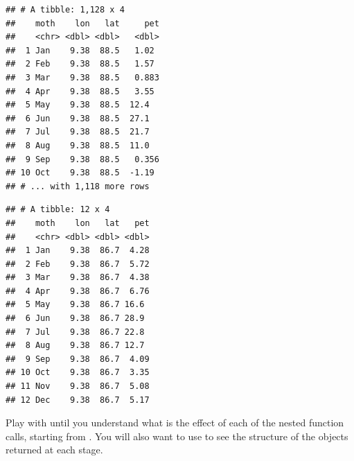 \documentclass[krantz2]{krantz}\usepackage{knitr}%
\begin{document}
\begin{knitrout}\footnotesize
{}\color{fgcolor}\begin{kframe}
\begin{alltt}
 \hlkwb{<-}
    \hlstd{(} \hlstd{=} \hlstd{(month.abb[}\hlopt{:}\hlstd{],} 
            \hlstd{= longitude[}\hlstd{],}
            \hlstd{=}   \hlstd{=} \hlstd{),}
            \hlstd{=} \hlstd{(}\hlstd{(} \hlstd{)[}\hlstd{, , ]))}
           \hlstd{)}
\end{alltt}
\begin{verbatim}
## # A tibble: 1,128 x 4
##    moth    lon   lat     pet
##    <chr> <dbl> <dbl>   <dbl>
##  1 Jan    9.38  88.5   1.02 
##  2 Feb    9.38  88.5   1.57 
##  3 Mar    9.38  88.5   0.883
##  4 Apr    9.38  88.5   3.55 
##  5 May    9.38  88.5  12.4  
##  6 Jun    9.38  88.5  27.1  
##  7 Jul    9.38  88.5  21.7  
##  8 Aug    9.38  88.5  11.0  
##  9 Sep    9.38  88.5   0.356
## 10 Oct    9.38  88.5  -1.19 
## # ... with 1,118 more rows
\end{verbatim}
\begin{alltt}
 \hlopt{==} \hlstd{latitude[}\hlstd{])}
\end{alltt}
\begin{verbatim}
## # A tibble: 12 x 4
##    moth    lon   lat   pet
##    <chr> <dbl> <dbl> <dbl>
##  1 Jan    9.38  86.7  4.28
##  2 Feb    9.38  86.7  5.72
##  3 Mar    9.38  86.7  4.38
##  4 Apr    9.38  86.7  6.76
##  5 May    9.38  86.7 16.6 
##  6 Jun    9.38  86.7 28.9 
##  7 Jul    9.38  86.7 22.8 
##  8 Aug    9.38  86.7 12.7 
##  9 Sep    9.38  86.7  4.09
## 10 Oct    9.38  86.7  3.35
## 11 Nov    9.38  86.7  5.08
## 12 Dec    9.38  86.7  5.17
\end{verbatim}
\end{kframe}
\end{knitrout}

\begin{playground}
Play with  until you understand what is the effect of each of the nested function calls, starting from . You will also want to use  to see the structure of the objects returned at each stage.
\end{playground}
\end{document}
